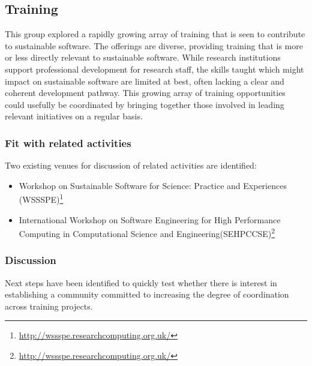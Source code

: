 \subsection{Training}


This group explored a rapidly growing array of training that is seen to
contribute to sustainable software. The offerings are diverse, providing
training that is more or less directly relevant to sustainable software. While
research institutions support professional development for research staff, the
skills taught which might impact on sustainable software are limited at best,
often lacking a clear and coherent development pathway. This growing array of
training opportunities could usefully be coordinated by bringing together those
involved in leading relevant initiatives on a regular basis.

\subsubsection{Fit with related activities} Two existing venues for discussion
of related activities are identified:

\begin{itemize}

\item Workshop on Sustainable Software for Science: Practice and
Experiences (WSSSPE)\footnote{\url{http://wssspe.researchcomputing.org.uk/}}

\item  International Workshop on Software Engineering for High
Performance Computing in Computational Science and
Engineering(SEHPCCSE)\footnote{\url{http://wssspe.researchcomputing.org.uk/}}

\end{itemize}

\subsubsection{Discussion}

Next steps have been identified to quickly test whether there is interest in
establishing a community committed to increasing the degree of coordination
across training projects.

